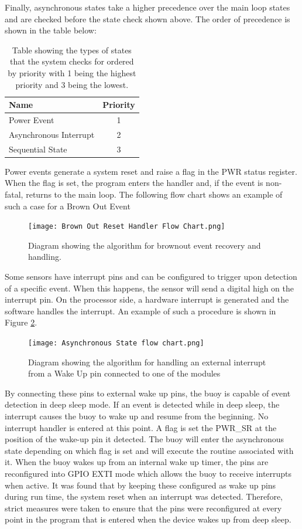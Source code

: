 Finally, asynchronous states take a higher precedence over the main loop states and are checked before the state check shown above. The order of precedence is shown in the table below:
\begin{table}[H]
	\centering
	\caption{Table showing the types of states that the system checks for ordered by priority with 1 being the highest priority and 3 being the lowest.}
	\begin{tabular}{lc}
		\hline
		Name & Priority \\
		\hline
		\hline
		Power Event & 1 \\
		\hline
		Asynchronous Interrupt & 2 \\
		\hline
		Sequential State & 3 \\
		\hline
		\hline
	\end{tabular}
	
	\label{tab:state_prio}
\end{table}

Power events generate a system reset and raise a flag in the PWR status register. When the flag is set, the program enters the handler and, if the event is non-fatal, returns to the main loop. The following flow chart shows an example of such a case for a Brown Out Event

\begin{figure}[H]
	\centering
	\texttt{[image: Brown Out Reset Handler Flow Chart.png]}
	\caption{Diagram showing the algorithm for brownout event recovery and handling.}
	\label{fig:evt_handle}
\end{figure}

Some sensors have interrupt pins and can be configured to trigger upon detection of a specific event. When this happens, the sensor will send a digital high on the interrupt pin. On the processor side, a hardware interrupt is generated and the software handles the interrupt. An example of such a procedure is shown in Figure \ref{fig:int_handle}.

\begin{figure}[H]
	\centering
	\texttt{[image: Asynchronous State flow chart.png]}
	\caption{Diagram showing the algorithm for handling an external interrupt from a Wake Up pin connected to one of the modules}
	\label{fig:int_handle}
\end{figure}

By connecting these pins to external wake up pins, the buoy is capable of event detection in deep sleep mode. If an event is detected while in deep sleep, the interrupt causes the buoy to wake up and resume from the beginning. No interrupt handler is entered at this point. A flag is set the PWR\_SR at the position of the wake-up pin it detected. The buoy will enter the asynchronous state depending on which flag is set and will execute the routine associated with it.  When the buoy wakes up from an internal wake up timer, the pins are reconfigured into GPIO EXTI mode which allows the buoy to receive interrupts when active. It was found that by keeping these configured as wake up pins during run time, the system reset when an interrupt was detected. Therefore, strict measures were taken to ensure that the pins were reconfigured at every point in the program that is entered when the device wakes up from deep sleep.

